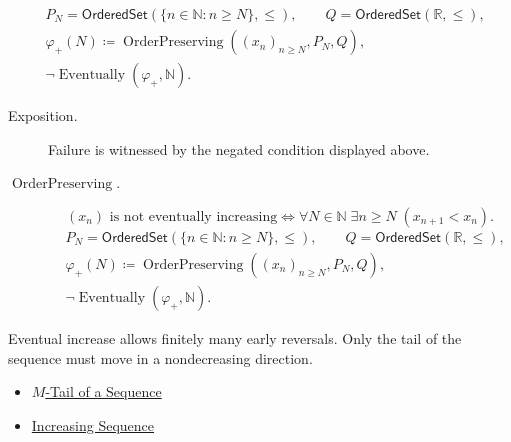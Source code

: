 \begin{remark*}
\[
\begin{aligned}
&P_N=\mathsf{OrderedSet}(\{n\in\mathbb{N}:n\ge N\},\leq),\qquad
Q=\mathsf{OrderedSet}(\mathbb{R},\leq),\\
&\varphi_{+}(N)\coloneqq
\operatorname{OrderPreserving}((x_n)_{n\ge N},P_N,Q),\\
&\neg\operatorname{Eventually}(\varphi_{+},\mathbb{N}).
\end{aligned}
\]
\end{remark*}
\begin{remark*}
\begin{description}
  \item[Exposition.]
Failure is witnessed by the negated condition displayed above.
  \item[\(\operatorname{OrderPreserving}.\)]
\[
(x_n)\text{ is not eventually increasing}
\Longleftrightarrow
\forall N\in\mathbb{N}\;\exists n\ge N\;(x_{n+1}<x_n).
\]
\[
\begin{aligned}
&P_N=\mathsf{OrderedSet}(\{n\in\mathbb{N}:n\ge N\},\leq),\qquad
Q=\mathsf{OrderedSet}(\mathbb{R},\leq),\\
&\varphi_{+}(N)\coloneqq
\operatorname{OrderPreserving}((x_n)_{n\ge N},P_N,Q),\\
&\neg\operatorname{Eventually}(\varphi_{+},\mathbb{N}).
\end{aligned}
\]
\end{description}
\end{remark*}

\begin{remark*}[Interpretation]
Eventual increase allows finitely many early reversals. Only the tail of the
sequence must move in a nondecreasing direction.
\end{remark*}

\begin{dependencies}
\begin{itemize}
  \item \hyperref[def:m-tail]{$M$-Tail of a Sequence}
  \item \hyperref[def:increasing-sequence]{Increasing Sequence}
\end{itemize}
\end{dependencies}


